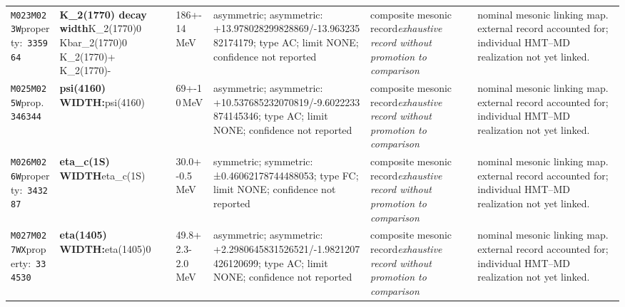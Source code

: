 \begin{landscape}
\begin{longtable}{L{1.85cm}L{4.45cm}L{2.35cm}L{4.05cm}L{3.35cm}L{7.15cm}}
\texttt{M023}\newline \texttt{M023W}\newline property:\ \texttt{335964} & \textbf{K\_\allowbreak{}2(1770) decay width}\newline K\_\allowbreak{}2(1770)0 \textbar{}\allowbreak{} Kbar\_\allowbreak{}2(1770)0 \textbar{}\allowbreak{} K\_\allowbreak{}2(1770)+ \textbar{}\allowbreak{} K\_\allowbreak{}2(1770)- & 186+-14\,MeV & asymmetric; asymmetric: +13.978028299828869/-13.96323582174179; type AC; limit NONE; confidence not reported & composite mesonic record\newline \emph{exhaustive record without promotion to comparison} & nominal mesonic linking map. external record accounted for; individual HMT--MD realization not yet linked. \\
\texttt{M025}\newline \texttt{M025W}\newline prop.\ \texttt{346344} & \textbf{psi(4160) WIDTH:}\newline psi(4160) & 69+-10\,MeV & asymmetric; asymmetric: +10.537685232070819/-9.6022233874145346; type AC; limit NONE; confidence not reported & composite mesonic record\newline \emph{exhaustive record without promotion to comparison} & nominal mesonic linking map. external record accounted for; individual HMT--MD realization not yet linked. \\
\texttt{M026}\newline \texttt{M026W}\newline property:\ \texttt{343287} & \textbf{eta\_\allowbreak{}c(1S) WIDTH}\newline eta\_\allowbreak{}c(1S) & 30.0+-0.5\,MeV & symmetric; symmetric: ±0.46062178744488053; type FC; limit NONE; confidence not reported & composite mesonic record\newline \emph{exhaustive record without promotion to comparison} & nominal mesonic linking map. external record accounted for; individual HMT--MD realization not yet linked. \\
\texttt{M027}\newline \texttt{M027WX}\newline property:\ \texttt{334530} & \textbf{eta(1405) WIDTH:}\newline eta(1405)0 & 49.8+2.3-2.0\,MeV & asymmetric; asymmetric: +2.2980645831526521/-1.9821207426120699; type AC; limit NONE; confidence not reported & composite mesonic record\newline \emph{exhaustive record without promotion to comparison} & nominal mesonic linking map. external record accounted for; individual HMT--MD realization not yet linked. \\

\end{longtable}
\end{landscape}
